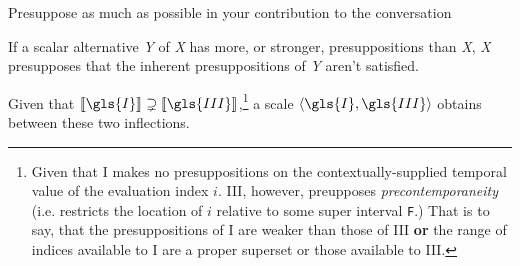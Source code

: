 \textsf{Presuppose as much as possible in your contribution to the conversation} 


If a scalar alternative \textit{Y} of \textit{X} has more, or stronger, presuppositions than \textit{X}, \textit{X} presupposes that the inherent presuppositions of \textit{Y} aren't satisfied.

\xe


Given that $ \denote{\gls{I}} \supsetneq \denote{\gls{III}}$,\footnote{
	Given that \gls{I} makes no presuppositions on the contextually-supplied temporal value of the evaluation index $ i $. \gls{III}, however, preupposes \textit{precontemporaneity} (i.e. restricts the location of $ i $ relative to some super interval \texttt{F}.) That is to say, that the presuppositions of \gls{I} are weaker than those of \gls{III} \textbf{or} the range of indices available to \gls{I} are a proper superset or those available to \gls{III}.
}
a scale $ \langle \gls{I},\gls{III}\rangle$ obtains between these two inflections.



